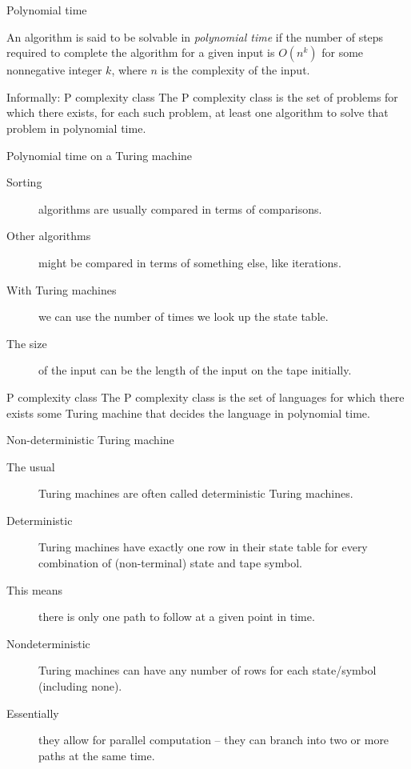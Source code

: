 \begin{frame}{Polynomial time}
  \begin{definition}
    An algorithm is said to be solvable in \emph{polynomial time} if the number of steps required to complete the algorithm for a given input is $O(n^k)$ for some nonnegative integer $k$, where $n$ is the complexity of the input.
  \end{definition}
  \vspace{4mm}
  \begin{alertblock}{Informally: P complexity class}
    The P complexity class is the set of problems for which there exists, for each such problem, at least one algorithm to solve that problem in polynomial time.
  \end{alertblock}
\end{frame}


\begin{frame}{Polynomial time on a Turing machine}
  \begin{description}
    \item[Sorting] algorithms are usually compared in terms of comparisons.
    \item[Other algorithms] might be compared in terms of something else, like iterations.
    \item[With Turing machines] we can use the number of times we look up the state table.
    \item[The size] of the input can be the length of the input on the tape initially.
  \end{description}
  \vspace{4mm}
  \begin{alertblock}{P complexity class}
    The P complexity class is the set of languages for which there exists some Turing machine that decides the language in polynomial time.
  \end{alertblock}
\end{frame}





\begin{frame}{Non-deterministic Turing machine}
  \begin{description}
    \item[The usual] Turing machines are often called deterministic Turing machines.
    \item[Deterministic] Turing machines have exactly one row in their state table for every combination of (non-terminal) state and tape symbol.
    \item[This means] there is only one path to follow at a given point in time.
    \item[Nondeterministic] Turing machines can have any number of rows for each state/symbol (including none).
    \item[Essentially] they allow for parallel computation -- they can branch into two or more paths at the same time.
  \end{description}
\end{frame}


